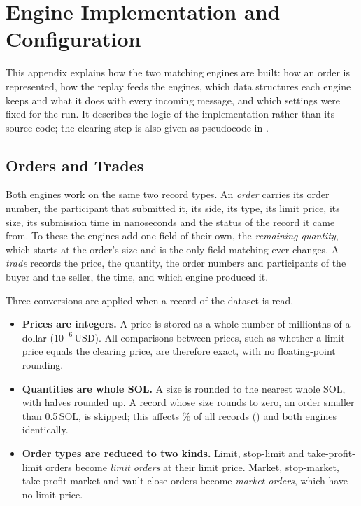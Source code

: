 \chapter{Engine Implementation and Configuration}
\label{app:config}

This appendix explains how the two matching engines are built: how an
order is represented, how the replay feeds the engines, which data
structures each engine keeps and what it does with every incoming message,
and which settings were fixed for the run. It describes the logic of the
implementation rather than its source code; the clearing step is also given
as pseudocode in .

\section{Orders and Trades}
\label{sec:implorders}

Both engines work on the same two record types. An \emph{order} carries its
order number, the participant that submitted it, its side, its type, its
limit price, its size, its submission time in nanoseconds and the status of
the record it came from. To these the engines add one field of their own,
the \emph{remaining quantity}, which starts at the order's size and is the
only field matching ever changes. A \emph{trade} records the price, the
quantity, the order numbers and participants of the buyer and the seller,
the time, and which engine produced it.

Three conversions are applied when a record of the dataset is read.

\begin{itemize}
  \item \textbf{Prices are integers.} A price is stored as a whole number of
  millionths of a dollar ($10^{-6}$\,USD). All comparisons between prices,
  such as whether a limit price equals the clearing price, are therefore
  exact, with no floating-point rounding.
  \item \textbf{Quantities are whole SOL.} A size is rounded to the nearest
  whole SOL, with halves rounded up. A record whose size rounds to zero, an
  order smaller than 0.5\,SOL, is skipped; this affects \SampleSkippedPct\%
  of all records () and both engines identically.
  \item \textbf{Order types are reduced to two kinds.} Limit, stop-limit and
  take-profit-limit orders become \emph{limit orders} at their limit price.
  Market, stop-market, take-profit-market and vault-close orders become
  \emph{market orders}, which have no limit price.
\end{itemize}

